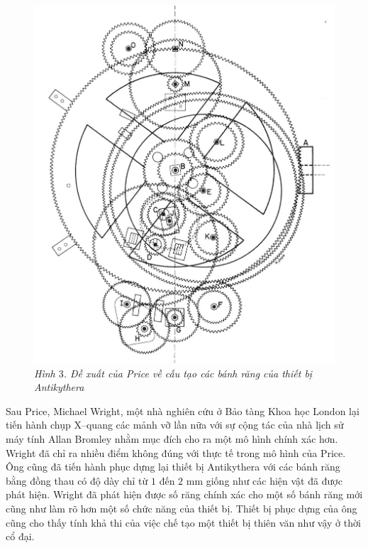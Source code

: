 \begin{multicols}{2}
\begin{figure}[H]
		\centering
		\captionsetup{labelformat= empty, justification=centering}
		\includegraphics[width= 0.85\linewidth]{4}
		\caption{\small\textit{\color{lichsutoanhoc}Hình $3$. Đề xuất của Price về cấu tạo các bánh răng của thiết bị Antikythera}}
		\vspace*{-10pt}
	\end{figure}
	Sau Price, Michael Wright, một nhà nghiên cứu ở Bảo tàng Khoa học London lại tiến hành chụp X--quang các mảnh vỡ lần nữa với sự cộng tác của nhà lịch sử máy tính Allan Bromley nhằm mục đích cho ra một mô hình chính xác hơn. Wright đã chỉ ra nhiều điểm không đúng với thực tế trong mô hình của Price. Ông cũng đã tiến hành phục dựng lại thiết bị Antikythera với các bánh răng bằng đồng thau có độ dày chỉ từ $1$ đến $2$ mm giống như các hiện vật đã được phát hiện. Wright đã phát hiện được số răng chính xác cho một số bánh răng mới cũng như làm rõ hơn một số chức năng của thiết bị. Thiết bị phục dựng của ông cũng cho thấy tính khả thi của việc chế tạo một thiết bị thiên văn như vậy ở thời cổ đại.
	\begin{figure}[H]
		\vspace*{-5pt}
		\centering
		\captionsetup{labelformat= empty, justification=centering}

\end{figure}
\end{multicols}
